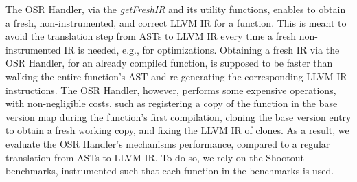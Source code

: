 

The OSR Handler, via the \textit{getFreshIR} and its utility functions, enables to obtain a fresh, non-instrumented, and correct LLVM IR for a function.
This is meant to avoid the translation step from ASTs to LLVM IR every time a fresh non-instrumented IR is needed, e.g., for optimizations.
Obtaining a fresh IR via the OSR Handler, for an already compiled function, is supposed to be faster than walking the entire function's AST and re-generating the corresponding LLVM IR instructions.
The OSR Handler, however, performs some expensive operations, with non-negligible costs, such as registering a copy of the function in the base version map during the function's first compilation, cloning the base version entry to obtain a fresh working copy, and fixing the LLVM IR of clones.
As a result, we evaluate the OSR Handler's mechanisms performance, compared to a regular translation from ASTs to LLVM IR.
To do so, we rely on the Shootout benchmarks\cite{Shootout}, instrumented such that each function in the benchmarks is used.\\

